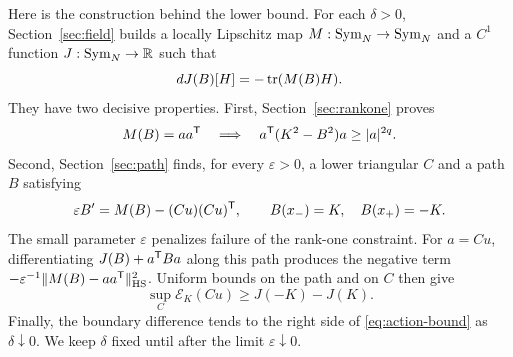 Here is the construction behind the lower bound. For each $\delta>0$,
Section~\ref{sec:field} builds a locally Lipschitz map
$M:\operatorname{Sym}_N\to\operatorname{Sym}_N$ and a $C^1$ function $J:\operatorname{Sym}_N\to\mathbb R$ such that
\begin{equation}\label{eq:framework-gradient}
 dJ(B)[H]=-\operatorname{tr}(M(B)H).
\end{equation}
They have two decisive properties. First, Section~\ref{sec:rankone} proves
\begin{equation}\label{eq:framework-rankone}
 M(B)=aa^{\mathsf T}\quad\Longrightarrow\quad
 a^{\mathsf T}(K^2-B^2)a\ge |a|^{2q}.
\end{equation}
Second, Section~\ref{sec:path} finds, for every $\varepsilon>0$, a lower
triangular $C$ and a path $B$ satisfying
\begin{equation}\label{eq:framework-path}
 \varepsilon B'=M(B)-(Cu)(Cu)^{\mathsf T},\qquad
 B(x_-)=K,\quad B(x_+)=-K.
\end{equation}
The small parameter $\varepsilon$ penalizes failure of the rank-one constraint.
For $a=Cu$, differentiating $J(B)+a^{\mathsf T}Ba$ along this path produces
the negative term $-\varepsilon^{-1}\|M(B)-aa^{\mathsf T}\|_{\mathrm{HS}}^2$.
Uniform bounds on the path and on $C$ then give
\[
 \sup_C\mathcal E_K(Cu)\ge J(-K)-J(K).
\]
Finally, the boundary difference tends to the right side of
\eqref{eq:action-bound} as $\delta\downarrow0$. We keep $\delta$ fixed until
after the limit $\varepsilon\downarrow0$.
